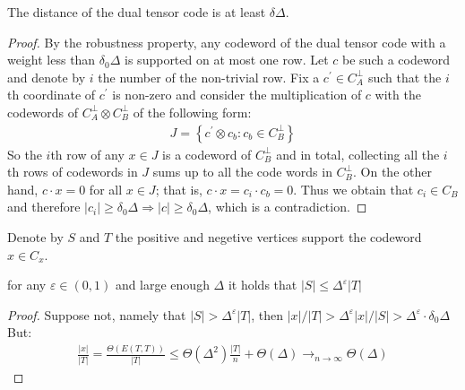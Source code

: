 \begin{claim}
  The distance of the dual tensor code is at least $\delta\Delta$.
\end{claim}
\begin{proof}
By the robustness property, any codeword of the dual tensor code with a weight less than $\delta_{0}\Delta$ is supported on at most one row. Let $c$ be such a codeword and denote by $i$ the number of the non-trivial row. Fix a $c^{\prime} \in C_{A}^{\perp}$ such that the $i$th coordinate of  $c^{\prime}$ is non-zero and consider the multiplication of $c$ with the codewords of $C_{A}^\perp \otimes C_{B}^\perp$ of the following form:
  \begin{equation*}
    \begin{split}
      J = \left\{ c^{\prime} \otimes c_{b} : c_{b}\in C_{B}^{\perp} \right\} 
    \end{split}
  \end{equation*}
  So the $i$th row of any $x \in J$ is a codeword of $C_{B}^{\perp}$ and in total, collecting all the $i$th rows of codewords in $J$ sums up to all the code words in $C_{B}^{\perp}$. On the other hand, $c\cdot x = 0$ for all $x \in J$; that is, $c\cdot x = c_{i} \cdot c_{b} = 0$. Thus we obtain that $c_{i} \in C_{B}$ and therefore $|c_{i}| \ge \delta_{0}\Delta \Rightarrow |c| \ge \delta_{0}\Delta$, which is a contradiction.
\end{proof}

Denote by $S$ and $T$ the positive and negetive vertices support the codeword $x \in C_{x}$.

\begin{claim}
  \label{claim:epss}
  for any $\varepsilon \in \left( 0,1 \right)$ and large enough $\Delta$  it holds that $ |S| \le \Delta^{\varepsilon}|T| $ 
\end{claim}
\begin{proof}
  Suppose not, namely that $|S| > \Delta^{\varepsilon}|T|$, then $|x|/|T| > \Delta^{\varepsilon}|x|/|S| > \Delta^{\varepsilon} \cdot \delta_{0}\Delta $ But:  
\begin{equation*}
  \begin{split}
    \frac{|x|}{|T|} = \frac{\Theta \left(E(T,T) \right)}{|T|} \le \Theta(\Delta^{2})\frac{|T|}{n}  + \Theta(\Delta)  \rightarrow_{n\rightarrow \infty} \Theta(\Delta)
  \end{split}
\end{equation*}
\end{proof}

